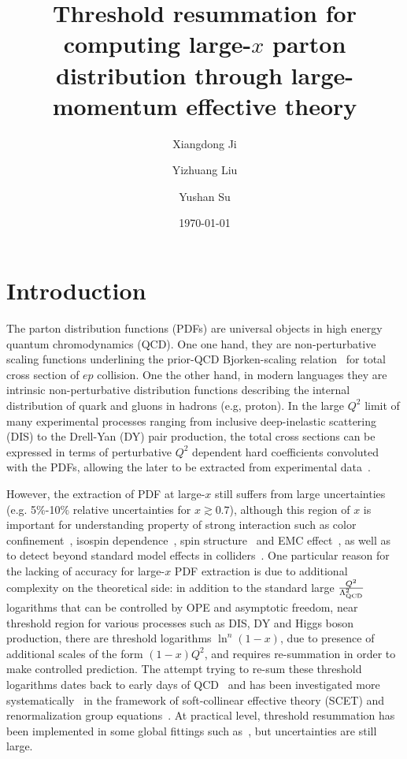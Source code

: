 \documentclass[a4paper,11pt]{article}
\title{Threshold resummation for computing large-$x$ parton distribution through large-momentum effective theory}
\author[a]{Xiangdong Ji}
\author[b]{Yizhuang Liu}
\author[a]{Yushan Su}
\affiliation[a]{Department of Physics, University of Maryland, College Park, MD 20742}
\affiliation[b]{Institute of Theoretical Physics,
Jagiellonian University, 30-348 Kraków, Poland}
\date{\today}
\begin{document}
\maketitle
\flushbottom
\section{Introduction}
The parton distribution functions (PDFs) are universal objects in high energy quantum chromodynamics (QCD). One one hand, they are non-perturbative scaling functions underlining the prior-QCD Bjorken-scaling relation~\cite{Bjorken:1968dy} for total cross section of $ep$ collision. One the other hand, in modern languages they are intrinsic non-perturbative distribution functions describing the internal distribution of quark and gluons in hadrons (e.g, proton). In the large $Q^2$ limit of many experimental processes ranging from inclusive deep-inelastic scattering (DIS) to the Drell-Yan (DY) pair production, the total cross sections can be expressed in terms of perturbative $Q^2$ dependent hard coefficients convoluted with the PDFs, allowing the later to be extracted from experimental data~\cite{Dulat:2015mca, Hou:2019efy, Accardi:2016qay, H1:2015ubc, Alekhin:2017kpj, Jimenez-Delgado:2014twa,Harland-Lang:2014zoa,NNPDF:2017mvq}. 

However, the extraction of PDF at large-$x$ still suffers from large uncertainties (e.g. 5$\%$-10$\%$ relative uncertainties for $x \gtrsim 0.7$),  although this region of $x$ is important for understanding property of strong interaction such as color confinement~\cite{Holt:2010vj}, isospin dependence~\cite{Afnan:2003vh,Tropiano:2018quk,JeffersonLabHallATritium:2021usd}, spin structure~\cite{JeffersonLabHallA:2016neg,STAR:2019yqm,Friscic:2021oti,Lagerquist:2022tml} and EMC effect~\cite{EuropeanMuon:1983wih,Ke:2023xeo}, as well as to detect beyond standard model effects in colliders~\cite{Kuhlmann:1999sf,CMS:2012ftr,ATLAS:2011juz}. One particular reason for the lacking of accuracy for large-$x$ PDF extraction is due to additional complexity on the theoretical side: in addition to the standard large $\frac{Q^2}{\Lambda_{\rm QCD}^2}$ logarithms that can be controlled by OPE and asymptotic freedom, near threshold region for various processes such as DIS, DY and Higgs boson production, there are threshold logarithms $\ln^n (1-x)$, due to presence of  additional scales of the form $(1-x)Q^2$, and requires re-summation in order to make controlled prediction.  The attempt trying to re-sum these threshold logarithms dates back to early days of QCD~\cite{Sterman:1986aj,Catani:1989ne} and has been investigated more systematically~\cite{Bauer:2002nz,Manohar:2003vb,Pecjak:2005uh,Chay:2005rz,Idilbi:2006dg,Chen:2006vd, Becher:2006mr,Bonvini:2012az} in the framework of soft-collinear effective theory (SCET) and renormalization group equations~\cite{Bauer:2000yr,Bauer:2001yt,Becher:2014oda}. At practical level,  threshold resummation has been implemented in some global fittings such as~\cite{Corcella:2005us,Aicher:2010cb,Bonvini:2015ira,Westmark:2017uig,Barry:2021osv}, but uncertainties are still large.
\end{document}
